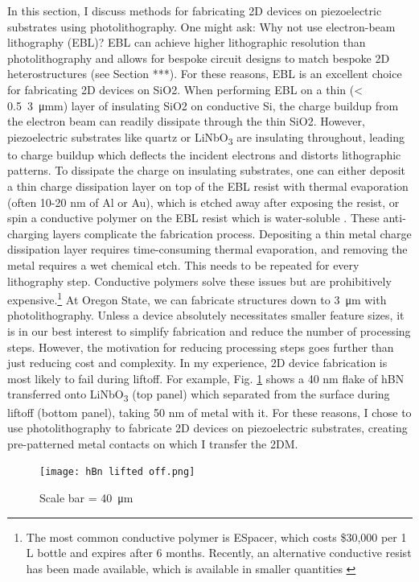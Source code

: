 \documentclass[double,12pt,1in]{beavtex}
\begin{document}
In this section, I discuss methods for fabricating 2D devices on piezoelectric substrates using photolithography. One might ask: Why not use electron-beam lithography (EBL)? EBL can achieve higher lithographic resolution than photolithography and allows for bespoke circuit designs to match bespoke 2D heterostructures (see Section ***). For these reasons, EBL is an excellent choice for fabricating 2D devices on SiO2. When performing EBL on a thin (< 0.5\ \SI{3}{\micro\meter}m) layer of insulating SiO2 on conductive Si, the charge buildup from the electron beam can readily dissipate through the thin SiO2. However, piezoelectric substrates like quartz or LiNbO\textsubscript{3} are insulating throughout, leading to charge buildup which deflects the incident electrons and distorts lithographic patterns. To dissipate the charge on insulating substrates, one can either deposit a thin charge dissipation layer on top of the EBL resist with thermal evaporation (often 10-20 nm of Al or Au), which is etched away after exposing the resist, or spin a conductive polymer on the EBL resist which is water-soluble \cite{noauthor_nanolithography_nodate}. These anti-charging layers complicate the fabrication process. Depositing a thin metal charge dissipation layer requires time-consuming thermal evaporation, and removing the metal requires a wet chemical etch. This needs to be repeated for every lithography step. Conductive polymers solve these issues but are prohibitively expensive.\footnote{The most common conductive polymer is ESpacer, which costs \$30,000 per 1 L bottle and expires after 6 months. Recently, an alternative conductive resist has been made available, which is available in smaller quantities \cite{lopez_charge_2019}}  At Oregon State, we can fabricate structures down to \SI{3}{\micro\meter} with photolithography. Unless a device absolutely necessitates smaller feature sizes, it is in our best interest to simplify fabrication and reduce the number of processing steps. However, the motivation for reducing processing steps goes further than just reducing cost and complexity. In my experience, 2D device fabrication is most likely to fail during liftoff. For example, Fig. \ref{fig:hBN lifted} shows a 40 nm flake of hBN transferred onto LiNbO\textsubscript{3} (top panel) which separated from the surface during liftoff (bottom panel), taking 50 nm of metal with it. For these reasons, I chose to use photolithography to fabricate 2D devices on piezoelectric substrates, creating pre-patterned metal contacts on which I transfer the 2DM.
\begin{figure}
    \texttt{[image: hBn lifted off.png]}
    \caption{Scale bar = \SI{40}{\micro\meter}}
    \label{fig:hBN lifted}
\end{figure}
\end{document}
